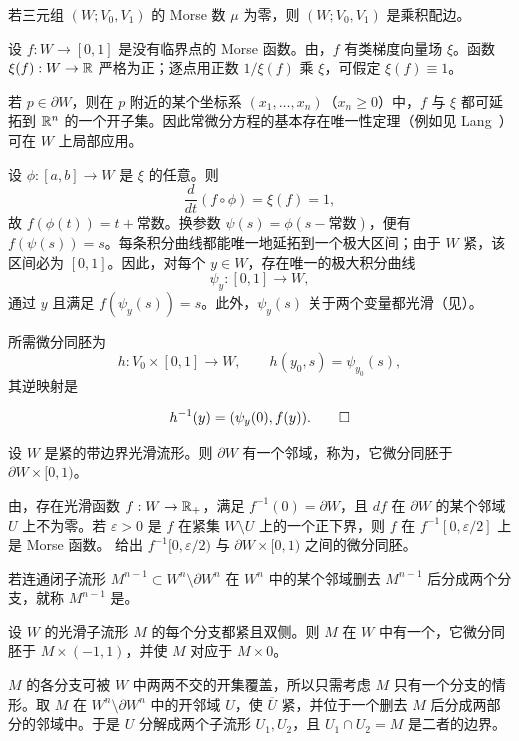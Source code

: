 若三元组 $(W;V_0,V_1)$ 的 Morse 数 $\mu$ 为零，则 $(W;V_0,V_1)$ 是乘积配边。

\Proof 设 $f:W\to[0,1]$ 是没有临界点的 Morse 函数。由，$f$ 有类梯度向量场 $\xi$。函数 $\xi(f):W\to\mathbb{R}$ 严格为正；逐点用正数 $1/\xi(f)$ 乘 $\xi$，可假定 $\xi(f)\equiv1$。

若 $p\in\partial W$，则在 $p$ 附近的某个坐标系 $(x_1,\ldots,x_n)$（$x_n\geq0$）中，$f$ 与 $\xi$ 都可延拓到 $\mathbb{R}^n$ 的一个开子集。因此常微分方程的基本存在唯一性定理（例如见 Lang~\cite[p.~55]{ref03}）可在 $W$ 上局部应用。

设 $\phi:[a,b]\to W$ 是 $\xi$ 的任意。则
\[
  \frac{d}{dt}(f\circ\phi)=\xi(f)=1,
\]
故 $f(\phi(t))=t+\text{常数}$。换参数 $\psi(s)=\phi(s-\text{常数})$，便有 $f(\psi(s))=s$。每条积分曲线都能唯一地延拓到一个极大区间；由于 $W$ 紧，该区间必为 $[0,1]$。因此，对每个 $y\in W$，存在唯一的极大积分曲线
\[
  \psi_y:[0,1]\longrightarrow W,
\]
通过 $y$ 且满足 $f(\psi_y(s))=s$。此外，$\psi_y(s)$ 关于两个变量都光滑（见）。

所需微分同胚为
\[
  h:V_0\times[0,1]\longrightarrow W,\qquad h(y_0,s)=\psi_{y_0}(s),
\]
其逆映射是
\begin{MilnorProofEnd}
\[
  h^{-1}(y)=(\psi_y(0),f(y)).\qedhere
\]
\end{MilnorProofEnd}

设 $W$ 是紧的带边界光滑流形。则 $\partial W$ 有一个邻域，称为\emph{}，它微分同胚于 $\partial W\times[0,1)$。

\Proof 由，存在光滑函数 $f:W\to\mathbb{R}_+$，满足 $f^{-1}(0)=\partial W$，且 $df$ 在 $\partial W$ 的某个邻域 $U$ 上不为零。若 $\varepsilon>0$ 是 $f$ 在紧集 $W\setminus U$ 上的一个正下界，则 $f$ 在 $f^{-1}[0,\varepsilon/2]$ 上是 Morse 函数。 给出 $f^{-1}[0,\varepsilon/2)$ 与 $\partial W\times[0,1)$ 之间的微分同胚。
\EndProof

若连通闭子流形 $M^{n-1}\subset W^n\setminus\partial W^n$ 在 $W^n$ 中的某个邻域删去 $M^{n-1}$ 后分成两个分支，就称 $M^{n-1}$ 是\emph{}。

设 $W$ 的光滑子流形 $M$ 的每个分支都紧且双侧。则 $M$ 在 $W$ 中有一个\emph{}，它微分同胚于 $M\times(-1,1)$，并使 $M$ 对应于 $M\times0$。

\Proof $M$ 的各分支可被 $W$ 中两两不交的开集覆盖，所以只需考虑 $M$ 只有一个分支的情形。取 $M$ 在 $W^n\setminus\partial W^n$ 中的开邻域 $U$，使 $\overline U$ 紧，并位于一个删去 $M$ 后分成两部分的邻域中。于是 $U$ 分解成两个子流形 $U_1,U_2$，且 $U_1\cap U_2=M$ 是二者的边界。


